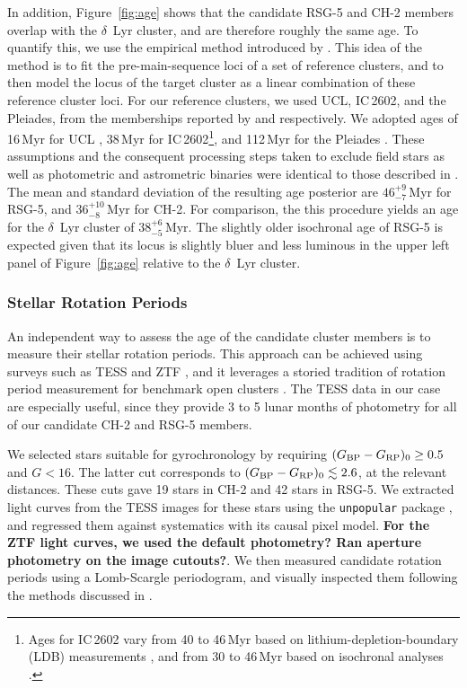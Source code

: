 \documentclass[12pt,twocolumn,linenumbers]{aastex63}
\newcommand{\bpmrpo}{(G_{\rm BP}-G_{\rm RP})_0}
\begin{document}
In addition, Figure~\ref{fig:age} shows that the candidate RSG-5 and
CH-2 members overlap with the $\delta$~Lyr cluster, and are therefore
roughly the same age.  To quantify this, we use the empirical method
introduced by \citet[][see their Section~6.3]{gagne_mutau_2020}.  This
idea of the method is to fit the pre-main-sequence loci of a set of
reference clusters, and to then model the locus of the target cluster
as a linear combination of these reference cluster loci.  For our
reference clusters, we used UCL, IC\,2602, and the Pleiades, from the
memberships reported by \citet{Damiani2019} and
\cite{CantatGaudin2018a} respectively.  We adopted ages of 16\,Myr for
UCL \citep{pecaut_star_2016}, 38\,Myr for IC\,2602\footnote{ Ages for
IC\,2602 vary from 40 to 46\,Myr based on lithium-depletion-boundary
(LDB) measurements \citep{dobbie_ic_2010,randich_gaiaeso_2018}, and
from 30 to 46\,Myr based on isochronal analyses
\citep{stauffer_rotational_1997,david_ages_2015,bossini_age_2019}.},
and 112\,Myr for the Pleiades \citep{dahm_2015}.  These assumptions
and the consequent processing steps taken to exclude field stars as
well as photometric and astrometric binaries were identical to those
described in \citet{bouma_kep1627_2022}.  The mean and standard
deviation of the resulting age posterior are $46^{+9}_{-7}$\,Myr for
RSG-5, and $36^{+10}_{-8}$\,Myr for CH-2.  For comparison, the this
procedure yields an age for the $\delta$~Lyr cluster of
$38^{+6}_{-5}$\,Myr.  The slightly older isochronal age of RSG-5 is
expected given that its locus is slightly bluer and less luminous in
the upper left panel of Figure~\ref{fig:age} relative to the
$\delta$~Lyr cluster.


\subsubsection{Stellar Rotation Periods}
\label{sec:rotation}

An independent way to assess the age of the candidate cluster members
is to measure their stellar rotation periods.  This approach can be
achieved using surveys such as TESS \citep{ricker_transiting_2015} and
ZTF \citep{bellm_zwicky_2019}, and it leverages a storied tradition of
rotation period measurement for benchmark open clusters \citep[see
{\it e.g.},][]{skumanich_time_1972,curtis_rup147_2020}.  The TESS data
in our case are especially useful, since they provide 3 to 5 lunar
months of photometry for all of our candidate CH-2 and RSG-5 members.

We selected stars suitable for gyrochronology by requiring $\bpmrpo
\geq 0.5$ and $G<16$.  The latter cut corresponds to $\bpmrpo \lesssim
2.6$, at the relevant distances.  These cuts gave 19 stars in CH-2 and
42 stars in RSG-5.  We extracted light curves from the TESS images for
these stars using the \texttt{unpopular} package
\citep{hattorio_2021_cpm}, and regressed them against systematics with
its causal pixel model.  {\bf For the ZTF light curves, we used the
default photometry?  Ran aperture photometry on the image cutouts?}.
We then measured candidate rotation periods using a Lomb-Scargle
periodogram, and visually inspected them following the methods
discussed in \citet{curtis_rup147_2020}.
\end{document}
